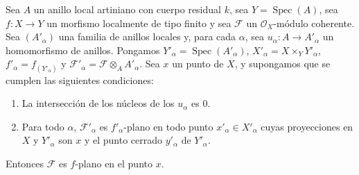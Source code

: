 \begin{proposition}[11.4.12]
\label{IV.11.4.12}
Sea $A$ un anillo local artiniano con cuerpo residual $k$,
sea $Y=\operatorname{Spec}(A)$, sea $f:X\to Y$ un morfismo localmente de tipo finito y sea $\mathcal F$ un $\mathcal O_X$-módulo coherente.
Sea $(A'_\alpha)$ una familia de anillos locales y, para cada $\alpha$, sea $u_\alpha:A\to A'_\alpha$ un homomorfismo
de anillos. Pongamos $Y'_\alpha=\operatorname{Spec}(A'_\alpha)$, $X'_\alpha=X\times_Y Y'_\alpha$,
$f'_\alpha=f_{(Y'_\alpha)}$ y $\mathcal F'_\alpha=\mathcal F\otimes_A A'_\alpha$. Sea $x$ un punto
de $X$, y supongamos que se cumplen las siguientes condiciones:
\begin{enumerate}[label=\textup{(\roman*)}]
  \item La intersección de los núcleos de los $u_\alpha$ es $0$.
  \item Para todo $\alpha$, $\mathcal F'_\alpha$ es $f'_\alpha$-plano en \textup{todo} punto $x'_\alpha\in X'_\alpha$ cuyas proyecciones en $X$ y $Y'_\alpha$
  son $x$ y el punto cerrado $y'_\alpha$ de $Y'_\alpha$.
\end{enumerate}

Entonces $\mathcal F$ es $f$-plano en el punto $x$.
\end{proposition}


